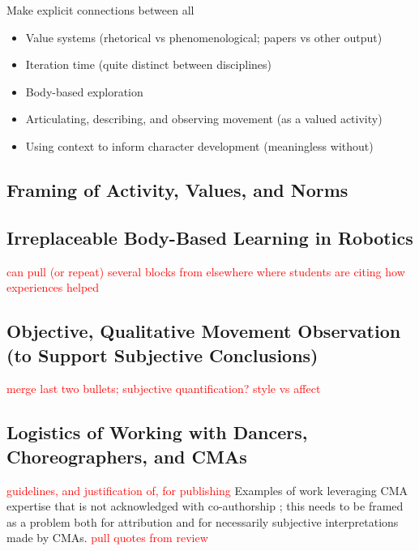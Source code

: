\documentclass[arts,article,submit,moreauthors,pdftex,10pt,a4paper]{mdpi}
\begin{document}
Make explicit connections between all

\begin{itemize}
\item Value systems (rhetorical vs phenomenological; papers vs other output)
\item Iteration time (quite distinct between disciplines)
\item Body-based exploration
\item Articulating, describing, and observing movement (as a valued activity)
\item Using context to inform character development (meaningless without)
\end{itemize}

\subsection{Framing of Activity, Values, and Norms}

\subsection{Irreplaceable Body-Based Learning in Robotics}

\textcolor{red}{can pull (or repeat) several blocks from elsewhere where students are citing how experiences helped}

\subsection{Objective, Qualitative Movement Observation (to Support Subjective Conclusions)}

\textcolor{red}{merge last two bullets; subjective quantification?}
\textcolor{red}{style vs affect}

\subsection{Logistics of Working with Dancers, Choreographers, and CMAs}

\textcolor{red}{guidelines, and justification of, for publishing}  Examples of work leveraging CMA expertise that is not acknowledged with co-authorship \cite{salaris2017robot}; this needs to be framed as a problem both for attribution and for necessarily subjective interpretations made by CMAs.  \textcolor{red}{pull quotes from review}

\end{document}
